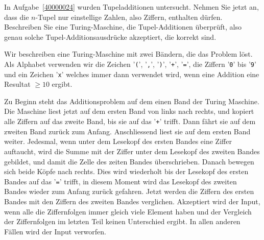 In Aufgabe~\ref{40000024} wurden Tupeladditionen untersucht.
Nehmen Sie jetzt an,
dass die $n$-Tupel nur einstellige Zahlen, also Ziffern, enthalten
dürfen. Beschreiben Sie eine Turing-Maschine, die Tupel-Additionen
überprüft, also genau solche Tupel-Additionsausdrücke akzeptiert,
die korrekt sind.


\begin{loesung}
Wir beschreiben eine Turing-Maschine mit zwei Bändern, die das
Problem löst. Als Alphabet verwenden wir die Zeichen '{\tt (}',
'{\tt ,}', '{\tt )}', '{\tt +}', '{\tt =}', die Ziffern '{\tt 0}' bis '{\tt 9}'
und ein Zeichen '{\tt x}' welches immer dann verwendet wird, wenn eine
Addition eine Resultat $\ge 10$ ergibt.

Zu Beginn steht das Additionsproblem auf dem einen Band der Turing Maschine.
Die Maschine liest jetzt auf dem ersten Band von links nach rechts,
und kopiert alle Ziffern auf das zweite Band, bis sie auf das '{\tt +}'
trifft. Dann fährt sie auf dem zweiten Band zurück zum Anfang.
Anschliessend liest sie auf dem ersten Band weiter. Jedesmal, wenn unter
dem Lesekopf des ersten Bandes eine Ziffer auftaucht, wird die Summe mit der
Ziffer unter dem Lesekopf des zweiten Bandes gebildet, und damit die Zelle
des zeiten Bandes überschrieben. Danach bewegen sich beide Köpfe nach
rechts. Dies wird wiederholt bis der Lesekopf des ersten Bandes auf das
'{\tt =}' trifft, in diesem Moment wird das Lesekopf des zweiten Bandes
wieder zum Anfang zurück gefahren. Jetzt werden die Ziffern des ersten
Bandes mit den Ziffern des zweiten Bandes verglichen. Akzeptiert wird
der Input, wenn alle die Ziffernfolgen immer gleich viele Element haben
und der Vergleich der Ziffernfolgen im letzten Teil keinen Unterschied ergibt.
In allen anderen Fällen wird der Input verworfen.
\end{loesung}
